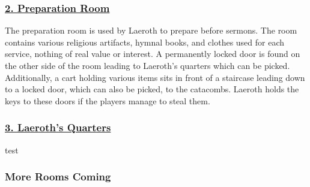 \begin{multicols*}{2}
\subsubsection*{\underline{2. Preparation Room}}
The preparation room is used by Laeroth to prepare before sermons. The room contains various religious artifacts, hymnal books, and clothes used for each service, nothing of real value or interest. A permanently locked door is found on the other side of the room leading to Laeroth's quarters which can be picked. Additionally, a cart holding various items sits in front of a staircase leading down to a locked door, which can also be picked, to the catacombs. Laeroth holds the keys to these doors if the players manage to steal them. 

\subsubsection*{\underline{3. Laeroth's Quarters}}
test

\subsubsection{More Rooms Coming}
\end{multicols*}


\pagebreak

